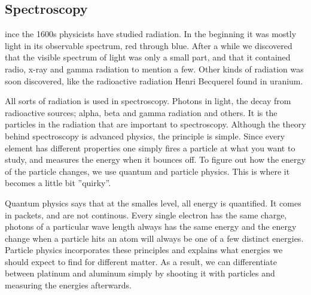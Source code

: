 \subsection{Spectroscopy}
ince the 1600s physicists have studied radiation.
In the beginning it was mostly light in its observable spectrum, red through blue.
After a while we discovered that the visible spectrum of light was only a small part, and that it contained radio, x-ray and gamma radiation to mention a few.
Other kinds of radiation was soon discovered, like the radioactive radiation Henri Becquerel \cite{First_radioactivity} found in uranium.

All sorts of radiation is used in spectroscopy. Photons in light, the decay from radioactive sources; alpha, beta and gamma radiation and others.
It is the particles in the radiation that are important to spectroscopy.
Although the theory behind spectroscopy is advanced physics, the principle is simple.
Since every element has different properties one simply fires a particle at what you want to study, and measures the energy when it bounces off.
To figure out how the energy of the particle changes, we use quantum and particle physics.
This is where it becomes a little bit ''quirky''.

Quantum physics says that at the smalles level, all energy is quantified.
It comes in packets, and are not continous.
Every single electron has the same charge, photons of a particular wave length always has the same energy and the energy change when a particle hits an atom will always be one of a few distinct energies.
Particle physics incorporates these principles and explains what energies we should expect to find for different matter.
As a result, we can differentiate between platinum and aluminum simply by shooting it with particles and measuring the energies afterwards.
